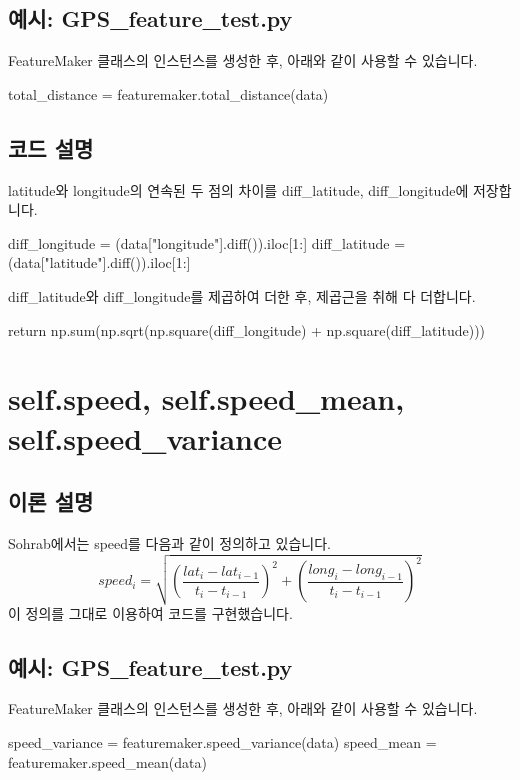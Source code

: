 \documentclass{oblivoir}
\begin{document}
  \subsection{예시: GPS\_feature\_test.py}
  FeatureMaker 클래스의 인스턴스를 생성한 후, 아래와 같이 사용할 수 있습니다.
  \begin{python}[label={GPS_feature_4}]
    total_distance = featuremaker.total_distance(data)
  \end{python}

  \subsection{코드 설명}
  latitude와 longitude의 연속된 두 점의 차이를 diff\_latitude, diff\_longitude에 저장합니다.
  \begin{python}[label={GPS_feature_5}]
    diff_longitude = (data["longitude"].diff()).iloc[1:]
    diff_latitude = (data["latitude"].diff()).iloc[1:]
  \end{python}
  diff\_latitude와 diff\_longitude를 제곱하여 더한 후, 제곱근을 취해 다 더합니다.
  \begin{python}[label={GPS_feature_6}]
    return np.sum(np.sqrt(np.square(diff_longitude) + np.square(diff_latitude)))
  \end{python}

  \section{self.speed, self.speed\_mean, self.speed\_variance}
  \subsection{이론 설명}
  Sohrab\cite{Sohrab}에서는 speed를 다음과 같이 정의하고 있습니다.
  \[speed_i=\sqrt{(\frac{lat_i-lat_{i-1}}{t_i-t_{i-1}})^2+(\frac{long_i-long_{i-1}}{t_i-t_{i-1}})^2}\]
  이 정의를 그대로 이용하여 코드를 구현했습니다.

  \subsection{예시: GPS\_feature\_test.py}
  FeatureMaker 클래스의 인스턴스를 생성한 후, 아래와 같이 사용할 수 있습니다.
  \begin{python}[label={GPS_feature_7}]
    speed_variance = featuremaker.speed_variance(data)
    speed_mean = featuremaker.speed_mean(data)
  \end{python}
\end{document}
